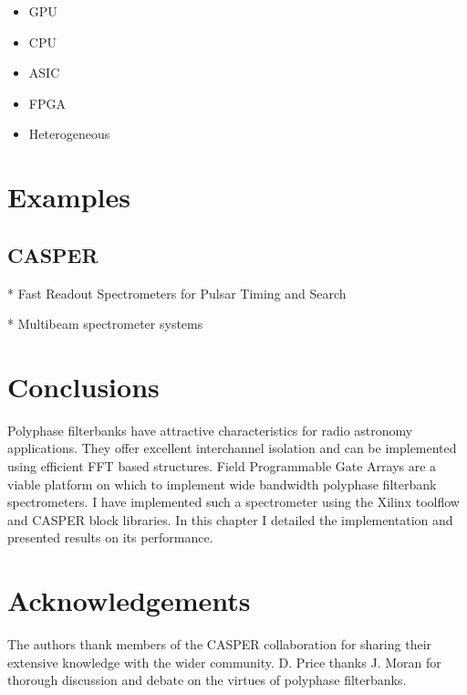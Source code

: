 \documentclass{ws-rv961x669}
\begin{document}
\begin{itemize}
	\item GPU
    \item CPU
    \item ASIC
    \item FPGA
    \item Heterogeneous	
\end{itemize}


\section{Examples}

\subsection{CASPER}

* Fast Readout Spectrometers for Pulsar Timing and Search

* Multibeam spectrometer systems

\section{Conclusions}

Polyphase filterbanks have attractive characteristics for radio astronomy applications. They offer excellent interchannel isolation and can be implemented using efficient FFT based structures. Field Programmable Gate Arrays are a viable platform on which to implement wide bandwidth polyphase filterbank spectrometers. I have implemented such a spectrometer using the Xilinx toolflow and CASPER block libraries. In this chapter I detailed the implementation and presented results on its performance.

\section{Acknowledgements}

The authors thank members of the CASPER collaboration for sharing their extensive knowledge with the wider community. D. Price thanks J. Moran for thorough discussion and debate on the virtues of polyphase filterbanks. 



\end{document}
